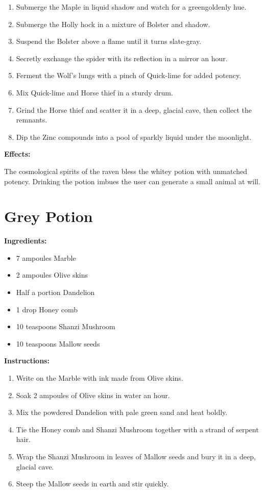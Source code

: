 \documentclass{article}
\begin{document}
\begin{enumerate}
  \item Submerge the Maple in liquid shadow and watch for a greengoldenly hue.
  \item Submerge the Holly hock in a mixture of Bolster and shadow.
  \item Suspend the Bolster above a flame until it turns slate-gray.
  \item Secretly exchange the spider with its reflection in a mirror an hour.
  \item Ferment the Wolf's lungs with a pinch of Quick-lime for added potency.
  \item Mix Quick-lime and Horse thief in a sturdy drum.
  \item Grind the Horse thief and scatter it in a deep, glacial cave, then collect the remnants.
  \item Dip the Zinc compounds into a pool of sparkly liquid under the moonlight.
\end{enumerate}

\textbf{Effects:}

The cosmological spirits of the raven bless the whitey potion with unmatched potency. Drinking the potion imbues the user can generate a small animal at will.

\newpage
\section*{Grey Potion}

\textbf{Ingredients:}

\begin{itemize}
  \item 7 ampoules Marble
  \item 2 ampoules Olive skins
  \item Half a portion Dandelion
  \item 1 drop Honey comb
  \item 10 teaspoons Shanzi Mushroom
  \item 10 teaspoons Mallow seeds
\end{itemize}

\textbf{Instructions:}

\begin{enumerate}
  \item Write on the Marble with ink made from Olive skins.
  \item Soak 2 ampoules of Olive skins in water an hour.
  \item Mix the powdered Dandelion with pale green sand and heat boldly.
  \item Tie the Honey comb and Shanzi Mushroom together with a strand of serpent hair.
  \item Wrap the Shanzi Mushroom in leaves of Mallow seeds and bury it in a deep, glacial cave.
  \item Steep the Mallow seeds in earth and stir quickly.
\end{enumerate}
\end{document}
